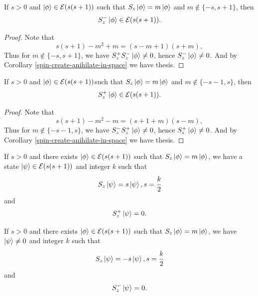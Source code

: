 \documentclass[main.tex]{subfiles}
\begin{document}
\begin{corollary}
If $s > 0$ and $\ket{\phi} \in \mathcal{E}(s(s + 1))$ such that $S_z\ket{\phi} = m\ket{\phi}$
and $m \not\in \{-s, s + 1 \}$, then 
\begin{equation}
S_z^{-}\ket{\phi} \in \mathcal{E}(s(s + 1)).
\end{equation}
\end{corollary}
\begin{proof}
Note that
\begin{equation}
s(s+1) - m^2 + m = (s - m + 1)(s + m),
\end{equation} 
Thus for $m \not\in \{-s, s + 1 \}$, we have $S_z^{+}S_z^{-}\ket{\phi} \not= 0$, hence 
$S_z^{-}\ket{\phi} \not= 0$. And by Corollary \ref{spin-create-anihilate-in-space} we have thesis.
\end{proof}

\begin{corollary}
If $s > 0$ and $\ket{\phi} \in \mathcal{E}(s(s + 1))$such that $S_z\ket{\phi} = m\ket{\phi}$
and $m \not\in \{-s - 1, s\}$, then 
\begin{equation}
S_z^{+}\ket{\phi} \in \mathcal{E}(s(s + 1)).
\end{equation}
\end{corollary}
\begin{proof}
Note that
\begin{equation}
s(s+1) - m^2 - m = (s + 1 + m)(s - m),
\end{equation} 
Thus for $m \not\in \{-s - 1, s\}$, we have $S_z^{-}S_z^{+}\ket{\phi} \not= 0$, hence 
$S_z^{+}\ket{\phi} \not= 0$.  And by Corollary \ref{spin-create-anihilate-in-space} we have thesis.
\end{proof}

\begin{corollary}
If $s > 0$ and there exists $\ket{\phi} \in \mathcal{E}(s(s + 1))$ such that $S_z\ket{\phi} = m\ket{\phi}$,
we have a state $\ket{\psi} \in \mathcal{E}(s(s + 1))$ and integer $k$ such that
\begin{equation}
S_z \ket{\psi} = s \ket{\psi}, s = \cfrac{k}{2}
\end{equation}
and
\begin{equation}
S^{+}_z \ket{\psi} = 0.
\end{equation}
\end{corollary}

\begin{corollary}
If $s > 0$ and there exists $\ket{\phi} \in \mathcal{E}(s(s + 1))$ such that $S_z\ket{\phi} = m\ket{\phi}$,
we have $\ket{\psi} \not= 0$ and integer $k$ such that
\begin{equation}
S_z \ket{\psi} = -s \ket{\psi}, s = \cfrac{k}{2}
\end{equation}
and
\begin{equation}
S^{-}_z \ket{\psi} = 0.
\end{equation}
\end{corollary}
\end{document}
